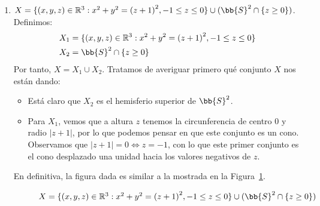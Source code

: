 \begin{ejercicio}
\begin{enumerate}[label=\alph*)]
\begin{description}
                Además, como $X$ es unión de dos conjuntos arcoconexos con intersección no vacía, tenemos que $X$ es arcoconexo, por lo que $X$ es simplemente conexo.
            \end{description}
        \item $X = \{(x,y,z)\in \mathbb{R}^3 : x^2+y^2 = {(z+1)}^{2}, -1\leq z\leq 0\}\cup (\bb{S}^2 \cap \{z\geq 0\})$.
            Definimos:
            \begin{align*}
                X_1 &= \{(x,y,z)\in \mathbb{R}^3 : x^2+y^2 = {(z+1)}^{2}, -1\leq z\leq 0\} \\
                X_2 &= \bb{S}^2 \cap \{z\geq 0\}
            \end{align*}
            Por tanto, $X = X_1\cup X_2$. Tratamos de averiguar primero qué conjunto $X$ nos están dando:
            \begin{itemize}
                \item Está claro que $X_2$ es el hemisferio superior de ${\bb{S}}^2$.
                \item Para $X_1$, vemos que a altura $z$ tenemos la circunferencia de centro $0$ y radio $|z+1|$, por lo que podemos pensar en que este conjunto es un cono. Observamos que $|z+1| = 0 \Longleftrightarrow z = -1$, con lo que este primer conjunto es el cono desplazado una unidad hacia los valores negativos de $z$.
            \end{itemize}
            En definitiva, la figura dada es similar a la mostrada en la Figura~\ref{fig:conjuntoX_C}.
            \begin{figure}[h]
                \centering
                \caption{$X = \{(x,y,z)\in \mathbb{R}^3 : x^2+y^2 = {(z+1)}^{2}, -1\leq z\leq 0\}\cup (\bb{S}^2 \cap \{z\geq 0\})$}
                \label{fig:conjuntoX_C}
            \end{figure}


\end{enumerate}
\end{ejercicio}

